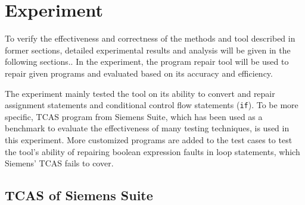 
\section{Experiment}
To verify the effectiveness and correctness of the methods and tool described in former sections, detailed experimental results and analysis will be given in the following sections..
In the experiment, the program repair tool will be used to repair given programs and evaluated based on its accuracy and efficiency.

The experiment mainly tested the tool on its ability to convert and repair assignment statements and conditional control flow statements (\lstinline|if|).
To be more specific, TCAS program from Siemens Suite, which has been used as a benchmark to evaluate the effectiveness of many testing techniques, is used in this experiment.
More customized programs are added to the test cases to test the tool's ability of repairing boolean expression faults in loop statements, which Siemens' TCAS fails to cover.

\subsection{TCAS of Siemens Suite}
